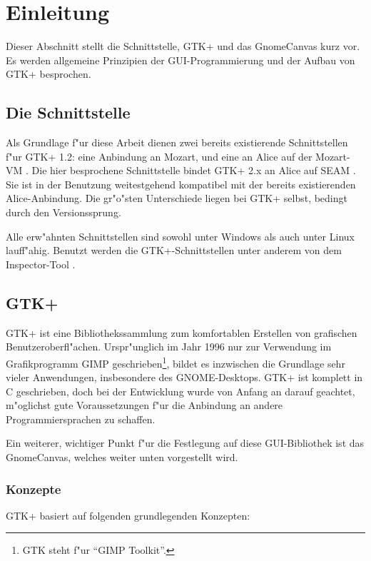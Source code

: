 \documentclass[a4paper,titlepage]{article}
\begin{document}
\tableofcontents

\section{Einleitung}

Dieser Abschnitt stellt die Schnittstelle, GTK+ und das GnomeCanvas kurz vor.
Es werden allgemeine Prinzipien der GUI-Programmierung und der Aufbau
von GTK+ besprochen.

\subsection{Die Schnittstelle}

Als Grundlage f"ur diese Arbeit dienen zwei bereits existierende
Schnittstellen f"ur GTK+ 1.2:
eine Anbindung an Mozart, und eine an Alice auf der Mozart-VM \cite{gtkmozart}.
Die hier besprochene Schnittstelle bindet GTK+ 2.x an Alice auf SEAM
\cite{seam}.
Sie ist in der Benutzung weitestgehend kompatibel mit der bereits existierenden
Alice-Anbindung. Die gr"o"sten Unterschiede liegen bei GTK+ selbst,
bedingt durch den Versionssprung.

Alle erw"ahnten Schnittstellen sind sowohl unter Windows als auch unter
Linux lauff"ahig. Benutzt werden die GTK+-Schnittstellen unter anderem von
dem Inspector-Tool \cite{inspector}.

\subsection{GTK+}

GTK+ ist eine Bibliothekssammlung zum komfortablen Erstellen von grafischen
Benutzeroberfl"achen. Urspr"unglich im Jahr 1996 nur zur Verwendung im
Grafikprogramm GIMP geschrieben\footnote{GTK steht f"ur ``GIMP Toolkit''.}, 
bildet es
inzwischen die Grundlage sehr vieler Anwendungen, insbesondere des 
GNOME-Desktops. GTK+ ist komplett
in C geschrieben, doch bei der Entwicklung wurde von Anfang an darauf geachtet,
m"oglichst gute Voraussetzungen f"ur die Anbindung an andere
Programmiersprachen zu schaffen. 

Ein weiterer, wichtiger Punkt f"ur die
Festlegung auf diese GUI-Bibliothek ist das GnomeCanvas, welches weiter
unten vorgestellt wird.

\subsubsection*{Konzepte} 
GTK+ basiert auf folgenden grundlegenden Konzepten:
\end{document}
